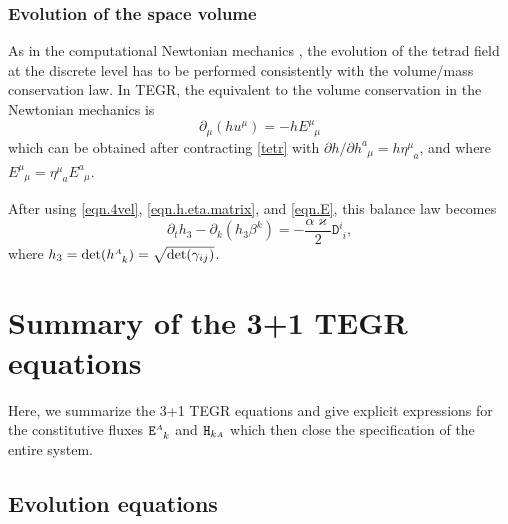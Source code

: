 \documentclass[
10pt, %
a4paper, %
oneside, %
twocolumn,
headinclude,footinclude, %
BCOR5mm, %
]{scrartcl}
\newcommand{\sA}{\mathsmaller A}
\newcommand{\pd}[1]{\partial_{#1}}
\newcommand{\tetrsymbol}{h}
\newcommand{\itetrsymbol}{\eta}
\newcommand{\itetr}[2]{\itetrsymbol^{#1}_{\phantom{#1}#2}}
\newcommand{\tetr}[2]{\tetrsymbol^{#1}_{\phantom{#1}#2}}
\newcommand{\detTetr}{\tetrsymbol}
\newcommand{\ET}[2]{E^{#1}_{\phantom{#1}#2}}	%
\newcommand{\Dfin}[2]{\mathtt{D}_{\phantom{#2}#1}^{#2}}	%
\newcommand{\Hfin}[2]{\mathtt{H}_{#2#1}}	%
\newcommand{\Efin}[2]{\mathtt{E}^{#1}_{\phantom{#1}#2}}	%
\newcommand{\shift}[1]{\beta^{#1}}
\begin{document}
	
	
	\subsubsection{Evolution of the space volume}
	
	As in the computational Newtonian mechanics \cite{DPRZ2016,SIGPR2021}, the evolution of the 
	tetrad 
	field at the discrete level has to be performed consistently with the volume/mass conservation 
	law. 
	In 
	TEGR, the equivalent to the volume conservation in the Newtonian mechanics is 
	\begin{equation}\label{eqn.pde.det}
		\pd{\mu}(\detTetr u^\mu) = -\detTetr \ET{\mu}{\mu} 
	\end{equation} 
	which can be obtained after contracting \eqref{tetr} with $ \partial \detTetr/\partial 
	\tetr{a}{\mu} 
	= \detTetr
	\itetr{\mu}{a} $, and where $ \ET{\mu}{\mu} = \itetr{\mu}{a} \ET{a}{\mu}$.
	
	
	After using \eqref{eqn.4vel}, \eqref{eqn.h.eta.matrix}, and \eqref{eqn.E}, this balance law 
	becomes
	\begin{equation}\label{eqn.h.PDE}
		\pd{t}\detTetr_3 - \pd{k}(\detTetr_3\shift{k} ) =-\frac{\alpha \varkappa}{2} \Dfin{i}{i},
	\end{equation}
	where $ \detTetr_3 =\det(\tetr{\sA}{k}) = \sqrt{\det(\gamma_{ij})} $.
	
	
	
	
	\section{Summary of the 3+1 TEGR equations}
	Here, we summarize the 3+1 TEGR equations and give explicit expressions for the 
	constitutive 
	fluxes $ \Efin{\sA}{k} $ and
	$ \Hfin{\sA}{k} $ which then close the specification of the entire system.
	
	
	\subsection{Evolution equations}
	
\end{document}
